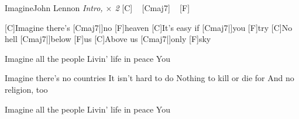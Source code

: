 \begin{song}{Imagine}{John Lennon}
\emph{Intro, $\times$ 2}
[C] ~ [Cmaj7] ~ [F] ~

[C]Imagine there's [Cmaj7|]{no} [F]heaven
[C]It's easy if [Cmaj7|]{you} [F]try
[C]No hell [Cmaj7|]{below} [F]us
[C]Above us [Cmaj7|]{only} [F]sky

\chorus Imagine all the people
Livin' life in peace
You

Imagine there's no countries
It isn't hard to do
Nothing to kill or die for
And no religion, too

\chorus
Imagine all the people
Livin' life in peace
You
\end{song}
